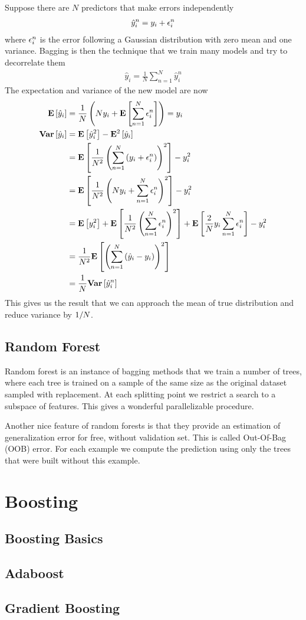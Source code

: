 Suppose there are $N$ predictors that make errors independently
\begin{align*}
	\hat{y}_i^n=y_i+\epsilon_i^n
\end{align*}
where $\epsilon_i^n$ is the error following a Gaussian distribution with zero mean and one variance. Bagging is then the technique that we train many models and try to decorrelate them
\begin{align*}
	\hat{y}_i=\frac{1}{N}\sum_{n=1}^N\hat{y}_i^n
\end{align*}
The expectation and variance of the new model are now
\begin{align*}
	\mathbf{E}\left[\hat{y}_i\right]&=\frac{1}{N}\left(Ny_i+\mathbf{E}\left[\sum_{n=1}^N\epsilon_i^n\right]\right)=y_i \\
	\mathbf{Var}\left[\hat{y}_i\right]&=\mathbf{E}\left[\hat{y}_i^2\right]-\mathbf{E}^2\left[\hat{y}_i\right] \\
	&=\mathbf{E}\left[\frac{1}{N^2}\left(\sum_{n=1}^N\left(y_i+\epsilon_i^n\right)\right)^2\right]-y_i^2 \\
	&=\mathbf{E}\left[\frac{1}{N^2}\left(Ny_i+\sum_{n=1}^N\epsilon_i^n\right)^2\right]-y_i^2 \\
	&=\mathbf{E}\left[y_i^2\right]+\mathbf{E}\left[\frac{1}{N^2}\left(\sum_{n=1}^N\epsilon_i^n\right)^2\right]+\mathbf{E}\left[\frac{2}{N}y_i\sum_{n=1}^N\epsilon_i^n\right]-y_i^2 \\
	&=\frac{1}{N^2}\mathbf{E}\left[\left(\sum_{n=1}^N\left(\hat{y}_i-y_i\right)\right)^2\right] \\
	&=\frac{1}{N}\mathbf{Var}\left[\hat{y}_i^n\right]
\end{align*}
This gives us the result that we can approach the mean of true distribution and reduce variance by $1/N$.

\subsection{Random Forest}

Random forest is an instance of bagging methods that we train a number of trees, where each tree is trained on a sample of the same size as the original dataset sampled with replacement. At each splitting point we restrict a search to a subspace of features. This gives a wonderful parallelizable procedure.

Another nice feature of random forests is that they provide an estimation of generalization error for free, without validation set. This is called Out-Of-Bag (OOB) error. For each example we compute the prediction using only the trees that were built without this example.

\section{Boosting}

\subsection{Boosting Basics}

\subsection{Adaboost}

\subsection{Gradient Boosting}
